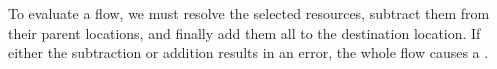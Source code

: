 \documentclass[nonacm, dvipsnames, sigconf]{acmart}
\begin{document}
To evaluate a flow, we must resolve the selected resources, subtract them from their parent locations, and finally add them all to the destination location.
If either the subtraction or addition results in an error, the whole flow causes a \revert.

\begin{mathpar}

\end{mathpar}



\end{document}
